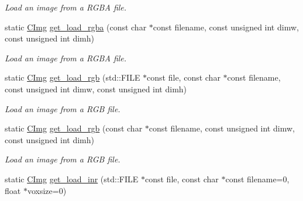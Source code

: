 \begin{DoxyCompactItemize}
\begin{DoxyCompactList}\small\item\em Load an image from a R\-G\-B\-A file. \end{DoxyCompactList}\item 
\hypertarget{structcimg__library_1_1_c_img_af78faae6e19f0a6753bd402f7c17e990}{static \hyperlink{structcimg__library_1_1_c_img}{C\-Img} \hyperlink{structcimg__library_1_1_c_img_af78faae6e19f0a6753bd402f7c17e990}{get\-\_\-load\-\_\-rgba} (const char $\ast$const filename, const unsigned int dimw, const unsigned int dimh)}\label{structcimg__library_1_1_c_img_af78faae6e19f0a6753bd402f7c17e990}

\begin{DoxyCompactList}\small\item\em Load an image from a R\-G\-B\-A file. \end{DoxyCompactList}\item 
\hypertarget{structcimg__library_1_1_c_img_a2f381d7d76854210ea6dff9db18c7f79}{static \hyperlink{structcimg__library_1_1_c_img}{C\-Img} \hyperlink{structcimg__library_1_1_c_img_a2f381d7d76854210ea6dff9db18c7f79}{get\-\_\-load\-\_\-rgb} (std\-::\-F\-I\-L\-E $\ast$const file, const char $\ast$const filename, const unsigned int dimw, const unsigned int dimh)}\label{structcimg__library_1_1_c_img_a2f381d7d76854210ea6dff9db18c7f79}

\begin{DoxyCompactList}\small\item\em Load an image from a R\-G\-B file. \end{DoxyCompactList}\item 
\hypertarget{structcimg__library_1_1_c_img_ab1cd5934d4bde1ab9988670d1a78b06e}{static \hyperlink{structcimg__library_1_1_c_img}{C\-Img} \hyperlink{structcimg__library_1_1_c_img_ab1cd5934d4bde1ab9988670d1a78b06e}{get\-\_\-load\-\_\-rgb} (const char $\ast$const filename, const unsigned int dimw, const unsigned int dimh)}\label{structcimg__library_1_1_c_img_ab1cd5934d4bde1ab9988670d1a78b06e}

\begin{DoxyCompactList}\small\item\em Load an image from a R\-G\-B file. \end{DoxyCompactList}\item 
\hypertarget{structcimg__library_1_1_c_img_a2c9ffc08d42b4756e03ef534f2a107bd}{static \hyperlink{structcimg__library_1_1_c_img}{C\-Img} \hyperlink{structcimg__library_1_1_c_img_a2c9ffc08d42b4756e03ef534f2a107bd}{get\-\_\-load\-\_\-inr} (std\-::\-F\-I\-L\-E $\ast$const file, const char $\ast$const filename=0, float $\ast$voxsize=0)}\label{structcimg__library_1_1_c_img_a2c9ffc08d42b4756e03ef534f2a107bd}


\end{DoxyCompactItemize}
